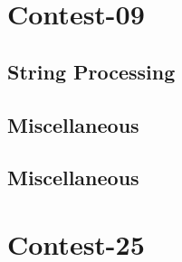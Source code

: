 \section{Contest-09}
\subsection{String Processing}
\raggedbottom
\vspace{-.7\baselineskip}\hrulefill
\vspace{0.1\baselineskip}\subsection{Miscellaneous}
\raggedbottom
\vspace{-.7\baselineskip}\hrulefill
\vspace{0.1\baselineskip}\subsection{Miscellaneous}
\raggedbottom
\vspace{-.7\baselineskip}\hrulefill
\vspace{0.1\baselineskip}
\section{Contest-25}

